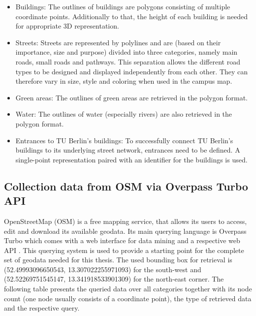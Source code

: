 \begin{itemize}
    \item Buildings: The outlines of buildings are polygons consisting of multiple coordinate points. Additionally to that, the height of each building is needed for appropriate 3D representation.
    \item Streets: Streets are represented by polylines and are (based on their importance, size and purpose) divided into three categories, namely main roads, small roads and pathways. This separation allows the different road types to be designed and displayed independently from each other. They can therefore vary in size, style and coloring when used in the campus map.
    \item Green areas: The outlines of green areas are retrieved in the polygon format.
    \item Water: The outlines of water (especially rivers) are also retrieved in the polygon format.
    \item Entrances to TU Berlin's buildings: To successfully connect TU Berlin's buildings to its underlying street network, entrances need to be defined. A single-point representation paired with an identifier for the buildings is used.
\end{itemize}

\subsection{Collection data from OSM via Overpass Turbo API}
OpenStreetMap (OSM) is a free mapping service, that allows its users to access, edit and download its available geodata. Its main querying language is Overpass Turbo which comes with a web interface for data mining and a respective web API \cite{openstreetmap_overpass_turbo}. This querying system is used to provide a starting point for the complete set of geodata needed for this thesis. The used bounding box for retrieval is (52.49993096650543, 13.307022255971093) for the south-west and (52.52269751545147, 13.341918533901309) for the north-east corner. The following table presents the queried data over all categories together with its node count (one node usually consists of a coordinate point), the type of retrieved data and the respective query.


